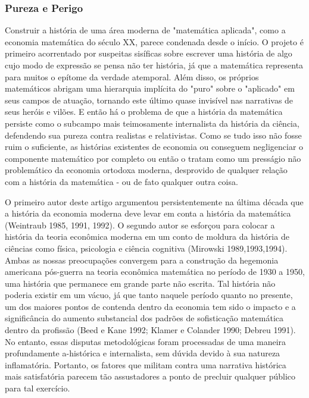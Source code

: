 \documentclass[12pt]{article}
\begin{document}
\subsubsection{\textbf{Pureza e Perigo}}
Construir a história de uma área moderna de "matemática aplicada", como a economia matemática do século XX, parece condenada desde o início. O projeto é primeiro acorrentado por suspeitas sisíficas sobre escrever uma história de algo cujo modo de expressão se pensa não ter história, já que a matemática representa para muitos o epítome da verdade atemporal. Além disso, os próprios matemáticos abrigam uma hierarquia implícita do "puro" sobre o "aplicado" em seus campos de atuação, tornando este último quase invisível nas narrativas de seus heróis e vilões. E então há o problema de que a história da matemática persiste como o subcampo mais teimosamente internalista da história da ciência, defendendo sua pureza contra realistas e relativistas. Como se tudo isso não fosse ruim o suficiente, as histórias existentes de economia ou conseguem negligenciar o componente matemático por completo ou então o tratam como um presságio não problemático da economia ortodoxa moderna, desprovido de qualquer relação com a história da matemática - ou de fato qualquer outra coisa.

O primeiro autor deste artigo argumentou persistentemente na última década que a história da economia moderna deve levar em conta a história da matemática (Weintraub 1985, 1991, 1992). O segundo autor se esforçou para colocar a história da teoria econômica moderna em um conto de moldura da história de ciências como física, psicologia e ciência cognitiva (Mirowski 1989,1993,1994). Ambas as nossas preocupações convergem para a construção da hegemonia americana pós-guerra na teoria econômica matemática no período de 1930 a 1950, uma história que permanece em grande parte não escrita. Tal história não poderia existir em um vácuo, já que tanto naquele período quanto no presente, um dos maiores pontos de contenda dentro da economia tem sido o impacto e a significância do aumento substancial dos padrões de sofisticação matemática dentro da profissão (Beed e Kane 1992; Klamer e Colander 1990; Debreu 1991). No entanto, essas disputas metodológicas foram processadas de uma maneira profundamente a-histórica e internalista, sem dúvida devido à sua natureza inflamatória. Portanto, os fatores que militam contra uma narrativa histórica mais satisfatória parecem tão assustadores a ponto de precluir qualquer público para tal exercício.
\end{document}
